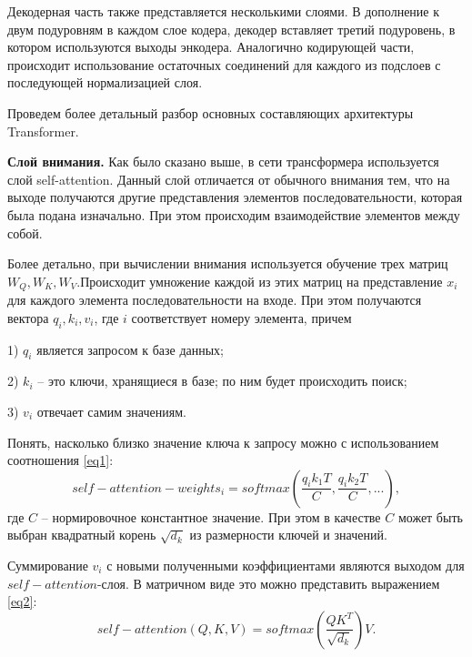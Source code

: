 \documentclass[14pt,a4paper]{extarticle}
\begin{document}
Декодерная часть также представляется несколькими слоями. В дополнение к двум
подуровням в каждом слое кодера, декодер вставляет третий подуровень, в котором используются выходы энкодера. Аналогично кодирующей части, происходит использование остаточных соединений
для каждого из подслоев с последующей нормализацией слоя. 

Проведем более детальный разбор основных составляющих архитектуры Transformer.

\textbf{Слой внимания.} Как было сказано выше, в сети трансформера используется слой self-attention. Данный слой отличается от обычного внимания тем, что на выходе получаются другие представления элементов последовательности, которая была подана изначально. При этом происходим взаимодействие элементов между собой.

Более детально, при вычислении внимания используется обучение трех матриц $W_Q, W_K, W_V$.Происходит умножение каждой из этих матриц на представление $x_i$ для каждого элемента последовательности на входе. При этом получаются вектора $q_i, k_i, v_i$, где $i$ соответствует номеру элемента, причем 

1) $q_i$ является запросом к базе данных;

2) $k_i$ -- это ключи, хранящиеся в базе; по ним будет происходить поиск;

3) $v_i$ отвечает самим значениям.

Понять, насколько близко значение ключа к запросу можно с использованием соотношения \ref{eq1}:
\begin{equation}
self-attention-weights_i = softmax\left(\dfrac{q_i k_1 T}{C}, \dfrac{q_i k_2 T}{C}, ... \right), \label{eq1}
\end{equation} 
где $C$ -- нормировочное константное значение. При этом в качестве $C$ может быть выбран квадратный корень $\sqrt{d_k}$ из размерности ключей и значений. 

Суммирование $v_i$ с новыми полученными коэффициентами являются выходом для $self-attention$-слоя. В матричном виде это можно представить выражением \ref{eq2}: 
\begin{equation}
self-attention(Q, K, V) = softmax\left(\dfrac{QK^T}{\sqrt{d_k}} \right)V.\label{eq2}
\end{equation}
\end{document}
